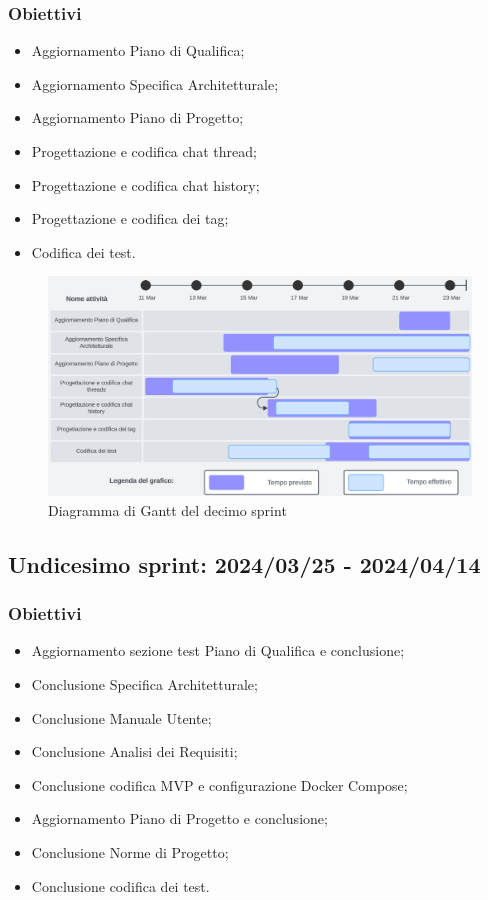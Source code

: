 \subsubsection{Obiettivi}
\begin{itemize}[itemsep=-2pt]
    \item Aggiornamento Piano di Qualifica;
    \item Aggiornamento Specifica Architetturale;
    \item Aggiornamento Piano di Progetto;
    \item Progettazione e codifica chat thread;
    \item Progettazione e codifica chat history;
    \item Progettazione e codifica dei tag;
    \item Codifica dei test.
\end{itemize}

\begin{figure}[h!]
    \centering
    \includegraphics[width=\textwidth]{Roadmap10sprint.png} 
    \caption{Diagramma di Gantt del decimo sprint}
    \label{fig:roadmaps10s}
\end{figure}
\newpage

\subsection{Undicesimo sprint: 2024/03/25 - 2024/04/14}
\subsubsection{Obiettivi}
\begin{itemize}[itemsep=-2pt]
    \item Aggiornamento sezione test Piano di Qualifica e conclusione;
    \item Conclusione Specifica Architetturale;
    \item Conclusione Manuale Utente;
    \item Conclusione Analisi dei Requisiti;
    \item Conclusione codifica MVP e configurazione Docker Compose;
    \item Aggiornamento Piano di Progetto e conclusione;
    \item Conclusione Norme di Progetto;
    \item Conclusione codifica dei test.
\end{itemize}

